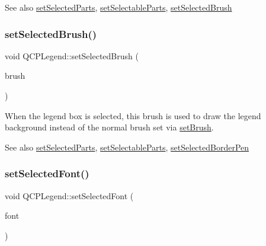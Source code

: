 \begin{DoxySeeAlso}{See also}
\mbox{\hyperlink{class_q_c_p_legend_a2aee309bb5c2a794b1987f3fc97f8ad8}{set\+Selected\+Parts}}, \mbox{\hyperlink{class_q_c_p_legend_a9ce60aa8bbd89f62ae4fa83ac6c60110}{set\+Selectable\+Parts}}, \mbox{\hyperlink{class_q_c_p_legend_a875227f3219c9799464631dec5e8f1bd}{set\+Selected\+Brush}} 
\end{DoxySeeAlso}
\mbox{\label{class_q_c_p_legend_a875227f3219c9799464631dec5e8f1bd}} 
\subsubsection{\texorpdfstring{set\+Selected\+Brush()}{setSelectedBrush()}}
{\footnotesize\ttfamily void Q\+C\+P\+Legend\+::set\+Selected\+Brush (\begin{DoxyParamCaption}\item[{const Q\+Brush \&}]{brush }\end{DoxyParamCaption})}

When the legend box is selected, this brush is used to draw the legend background instead of the normal brush set via \mbox{\hyperlink{class_q_c_p_legend_a497bbcd38baa3598c08e2b3f48103f23}{set\+Brush}}.

\begin{DoxySeeAlso}{See also}
\mbox{\hyperlink{class_q_c_p_legend_a2aee309bb5c2a794b1987f3fc97f8ad8}{set\+Selected\+Parts}}, \mbox{\hyperlink{class_q_c_p_legend_a9ce60aa8bbd89f62ae4fa83ac6c60110}{set\+Selectable\+Parts}}, \mbox{\hyperlink{class_q_c_p_legend_a2c35d262953a25d96b6112653fbefc88}{set\+Selected\+Border\+Pen}} 
\end{DoxySeeAlso}
\mbox{\label{class_q_c_p_legend_ab580a01c3c0a239374ed66c29edf5ad2}} 
\subsubsection{\texorpdfstring{set\+Selected\+Font()}{setSelectedFont()}}
{\footnotesize\ttfamily void Q\+C\+P\+Legend\+::set\+Selected\+Font (\begin{DoxyParamCaption}\item[{const Q\+Font \&}]{font }\end{DoxyParamCaption})}

